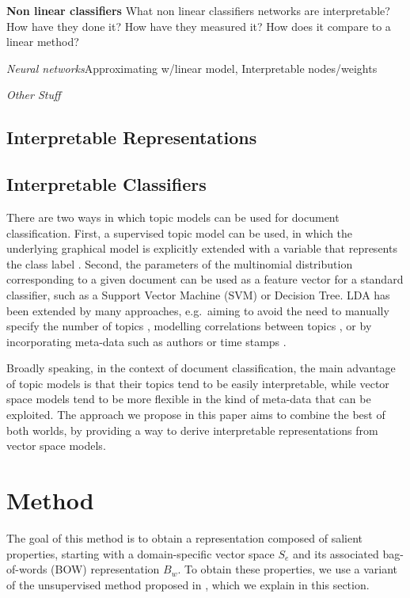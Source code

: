 \textbf{Non linear classifiers}
What non linear classifiers networks are interpretable? How have they done it? How have they measured it? How does it compare to a linear method?

\textit {Neural networks}Approximating w/linear model, Interpretable nodes/weights

\textit {Other Stuff}

\subsection{Interpretable Representations}


\subsection{Interpretable Classifiers}


There are two ways in which topic models can be used for document classification. First, a supervised topic model can be used, in which the underlying graphical model is explicitly extended with a variable that represents the class label \cite{Blei2010}. Second, the parameters of the multinomial distribution corresponding to a given document can be used as a feature vector for a standard classifier, such as a Support Vector Machine (SVM) or Decision Tree. LDA has been extended by many approaches, e.g.\ aiming to avoid the need to manually specify the number of topics \cite{teh2005sharing}, modelling correlations between topics \cite{Blei2006}, or by incorporating meta-data such as authors \cite{rosen2004author} or time stamps \cite{wang2006topics}.



Broadly speaking, in the context of document classification, the main advantage of topic models is that their topics tend to be easily interpretable, while vector space models tend to be more flexible in the kind of meta-data that can be exploited. The approach we propose in this paper aims to combine the best of both worlds, by providing a way to derive interpretable representations from vector space models.



\section{Method}



The goal of this method is to obtain a representation composed of salient properties, starting with a domain-specific vector space $S_e$ and its associated bag-of-words (BOW) representation $B_w$. To obtain these properties, we use a variant of the unsupervised method proposed in \cite{derracAIJ}, which we explain in this section. 
